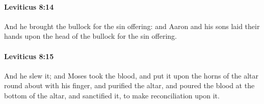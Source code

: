		\paragraph{Leviticus 8:14} %
			\label{LEVITICUS-8-14}

			And he brought the bullock for the sin offering: and Aaron and his sons laid their hands upon the head of the bullock for the sin offering.


		\paragraph{Leviticus 8:15} %
			\label{LEVITICUS-8-15}

			And he slew it; and Moses took the blood, and put it upon the horns of the altar round about with his finger, and purified the altar, and poured the blood at the bottom of the altar, and sanctified it, to make reconciliation upon it.

